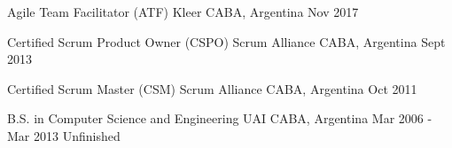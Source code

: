
\begin{cventries}
  \cventry
    {Agile Team Facilitator (ATF)} %
    {Kleer} %
    {CABA, Argentina} %
    {Nov 2017} %
    {}
    
  \cventry
    {Certified Scrum Product Owner (CSPO)} %
    {Scrum Alliance} %
    {CABA, Argentina} %
    {Sept 2013} %
    {}

  \cventry
    {Certified Scrum Master (CSM)} %
    {Scrum Alliance} %
    {CABA, Argentina} %
    {Oct 2011} %
    {}

  \cventry
    {B.S. in Computer Science and Engineering} %
    {UAI} %
    {CABA, Argentina} %
    {Mar 2006 - Mar 2013} %
    {Unfinished}

\end{cventries}
